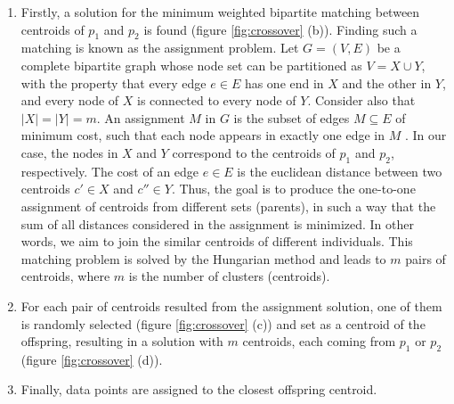 \begin{enumerate}

	\item Firstly, a solution for the minimum weighted bipartite matching between centroids of $p_1$ and $p_2$ is found (figure \ref{fig:crossover} (b)). Finding such a matching is known as the assignment problem. Let $G = (V, E)$ be a complete bipartite graph whose node set can be partitioned as $V = X \cup Y$, with the property that every edge $e \in E$ has one end in $X$ and the other in $Y$, and every node of $X$ is connected to every node of $Y$. Consider also that $|X| = |Y| = m$. An assignment $M$ in $G$ is the subset of edges $M \subseteq E$ of minimum cost, such that each node appears in exactly one edge in $M$ \cite{tardos}. In our case, the nodes in $X$ and $Y$ correspond to the centroids of $p_1$ and $p_2$, respectively. The cost of an edge $e \in E$ is the euclidean distance between two centroids $c' \in X$ and $c'' \in Y$. Thus, the goal is to produce the one-to-one assignment of centroids from different sets (parents), in such a way that the sum of all distances considered in the assignment is minimized. In other words, we aim to join the similar centroids of different individuals. This matching problem is solved by the Hungarian method \cite{Kuhn1955} and leads to $m$ pairs of centroids, where $m$ is the number of clusters (centroids).


	\item For each pair of centroids resulted from the assignment solution, one of them is randomly selected (figure \ref{fig:crossover} (c)) and set as a centroid of the offspring, resulting in a solution with $m$ centroids, each coming from $p_1$ or $p_2$ (figure \ref{fig:crossover} (d)).

	\item Finally, data points are assigned to the closest offspring centroid.
\end{enumerate}

